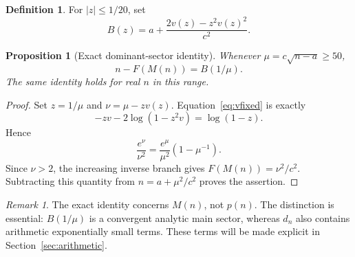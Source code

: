 \documentclass[11pt]{article}
\numberwithin{equation}{section}
\newtheorem{proposition}[theorem]{Proposition}
\theoremstyle{definition}
\newtheorem{definition}[theorem]{Definition}
\theoremstyle{remark}
\newtheorem{remark}[theorem]{Remark}
\begin{document}
\begin{definition}\label{def:B}
For $|z|\le1/20$, set
\begin{equation}\label{eq:B}
 B(z)=a+\frac{2v(z)-z^2v(z)^2}{c^2}.
\end{equation}
\end{definition}
\begin{proposition}[Exact dominant-sector identity]\label{prop:Bidentity}
Whenever $\mu=c\sqrt{n-a}\ge50$,
\begin{equation}\label{eq:Bidentity}
 n-F(M(n))=B(1/\mu).
\end{equation}
The same identity holds for real $n$ in this range.
\end{proposition}
\begin{proof}
Set $z=1/\mu$ and $\nu=\mu-zv(z)$. Equation~\eqref{eq:vfixed} is
exactly
\[
 -zv-2\log(1-z^2v)=\log(1-z).
\]
Hence
\[
 \frac{e^\nu}{\nu^2}
 =\frac{e^\mu}{\mu^2}(1-\mu^{-1}).
\]
Since $\nu>2$, the increasing inverse branch gives
$F(M(n))=\nu^2/c^2$. Subtracting this quantity from
$n=a+\mu^2/c^2$ proves the assertion.
\end{proof}

\begin{remark}
The exact identity concerns $M(n)$, not $p(n)$. The distinction is
essential: $B(1/\mu)$ is a convergent analytic main sector, whereas
$d_n$ also contains arithmetic exponentially small terms. These terms
will be made explicit in Section~\ref{sec:arithmetic}.
\end{remark}
\end{document}
